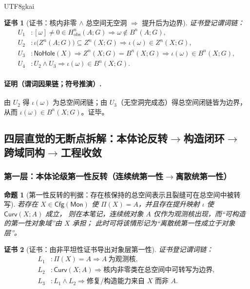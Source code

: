\documentclass[12pt]{article}
\newtheorem{proposition}{命题}[section]
\newtheorem{Certificate}{证书}[section]
\newcommand{\KouJing}{\texorpdfstring{表述约定}{表述约定}}
\begin{document}
\begin{CJK*}{UTF8}{gkai}
\begin{Certificate}[证书：核内非零 $\wedge$ 总空间无空洞 $\Rightarrow$ 提升后为边界]
\label{cert:tex29-ch15-undecidability-transport}
证书登记谓词链：
\[
\begin{aligned}
  U_1 &: [\omega]\neq 0\in H^n_{\mathrm{obs}}(A;G)\Rightarrow \omega\notin B^n(A;G),\\
  U_2 &: \iota\bigl(Z^n(A;G)\bigr)\subseteq Z^n(X;G)\Rightarrow \iota(\omega)\in Z^n(X;G),\\
  U_3 &: \mathsf{NoHole}(X)\Rightarrow Z^n(X;G)=B^n(X;G)\Rightarrow \iota(\omega)\in B^n(X;G),\\
  U_4 &: U_2\wedge U_3\Rightarrow \iota(\omega)\in B^n(X;G).
\end{aligned}
\]
\end{Certificate}

\paragraph{证明（谓词因果链；符号推演）.}
由 $U_2$ 得 $\iota(\omega)$ 为总空间闭链；由 $U_3$（无空洞完成态）得总空间闭链皆为边界，
从而 $\iota(\omega)\in B^n(X;G)$。证毕。

\subsection{四层直觉的无断点拆解：本体论反转\texorpdfstring{$\to$}{->}构造闭环\texorpdfstring{$\to$}{->}跨域同构\texorpdfstring{$\to$}{->}工程收敛}
\label{subsec:tex29-ch15-four-levels}

\subsubsection{第一层：本体论级第一性反转（连续统第一性\texorpdfstring{$\to$}{->}离散统第一性）}
\label{subsubsec:tex29-ch15-level1}

\begin{proposition}[第一性反转的判据：存在核保持的总空间表示且裂缝可在总空间中被转写]
\label{prop:tex29-ch15-level1}
若存在 $X\in\mathsf{Cfg}(\mathsf{Mon})$ 使 $\Pi(X)=A$，并且存在提升映射 $\iota$ 使 $\mathsf{Curv}(X;A)$ 成立，
则在本笔记，连续统对象 $A$ 仅作为观测核出现，而“可构造的第一性对象域”由 $X$ 承担；
此时可将该情形记为“离散统第一性成立于对象层”。
\end{proposition}

\begin{Certificate}[证书：由非平坦性证书导出对象层第一性]
\label{cert:tex29-ch15-level1}
证书登记谓词链：
\[
\begin{aligned}
  L_1 &: \Pi(X)=A\Rightarrow A\ \text{为观测核},\\
  L_2 &: \mathsf{Curv}(X;A)\Rightarrow \text{核内非零类在总空间中可转写为边界},\\
  L_3 &: L_1\wedge L_2\Rightarrow \text{修复/构造能力来自 }X\text{ 而非 }A.
\end{aligned}
\]
\end{Certificate}


\end{CJK*}
\end{document}
